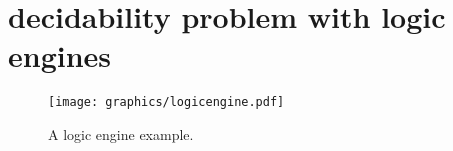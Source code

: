 \section{decidability problem with logic engines}
\begin{figure}[!htbp]
\begin{center}
\texttt{[image: graphics/logicengine.pdf]}
\caption{A logic engine example.}\label{fig:logicengine-1}
\end{center}
\end{figure}
